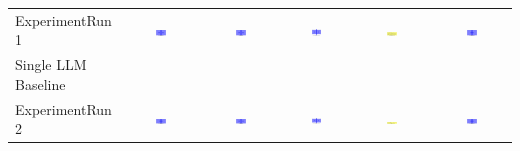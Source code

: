 \begin{table}
\begin{tabular}{@{}lccccc@{}}
    ExperimentRun 1 & \includegraphics[width=0.15\textwidth]{./run_1/png/gpt-4o_results/BasicLayout.png} & \includegraphics[width=0.15\textwidth]{./run_1/png/o1-preview_results/BasicLayout.png} & \includegraphics[width=0.15\textwidth]{./run_1/png/claude-3-5-sonnet-20240620_results/BasicLayout.png} & \includegraphics[width=0.15\textwidth]{./run_1/png/watsonx_meta-llama_llama-3-1-70b-instruct_results/BasicLayout.png} & \includegraphics[width=0.15\textwidth]{./run_1/png/watsonx_meta-llama_llama-3-405b-instruct_results/BasicLayout.png} \\
    Single LLM Baseline \\
    ExperimentRun 2 & \includegraphics[width=0.15\textwidth]{./run_2/png/gpt-4o_results/BasicLayout.png} & \includegraphics[width=0.15\textwidth]{./run_2/png/o1-preview_results/BasicLayout.png} & \includegraphics[width=0.15\textwidth]{./run_2/png/claude-3-5-sonnet-20240620_results/BasicLayout.png} & \includegraphics[width=0.15\textwidth]{./run_2/png/watsonx_meta-llama_llama-3-1-70b-instruct_results/BasicLayout.png} & \includegraphics[width=0.15\textwidth]{./run_2/png/watsonx_meta-llama_llama-3-405b-instruct_results/BasicLayout.png} \\

\end{tabular}
\end{table}
